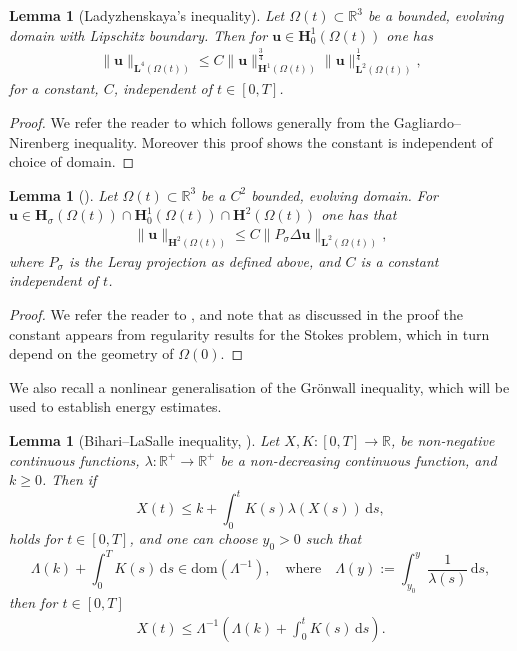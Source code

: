 \documentclass[a4paper]{amsart}
\numberwithin{equation}{section}
\theoremstyle{plain}
\newtheorem{lemma}[theorem]{Lemma}
\newcommand{\mbf}[1]{\mathbf{#1}}
\newcommand{\mbb}[1]{\mathbb{#1}}
\begin{document}
\begin{lemma}[Ladyzhenskaya's inequality]
	Let $\Omega(t) \subset \mbb{R}^3$ be a bounded, evolving domain with Lipschitz boundary.
	Then for $\mbf{u} \in \mbf{H}_0^1(\Omega(t))$ one has
	\begin{align}
		\|\mbf{u}\|_{\mbf{L}^4(\Omega(t))} \leq C \|\mbf{u}\|_{\mbf{H}^1(\Omega(t))}^{\frac{3}{4}}\|\mbf{u}\|_{\mbf{L}^2(\Omega(t))}^{\frac{1}{4}}, \label{ladyzhenskaya inequality}
	\end{align}
	for a constant, $C$, independent of $t \in [0,T]$.
\end{lemma}
\begin{proof}
    We refer the reader to \cite[Lemma 3.3.5]{temam2001navier} which follows generally from the Gagliardo--Nirenberg inequality.
    Moreover this proof shows the constant is independent of choice of domain.
\end{proof}

\begin{lemma}[{\cite[Theorem 2.23]{robinson2016three}}]
	Let $\Omega(t) \subset \mbb{R}^3$ be a $C^{2}$ bounded, evolving domain.
	For $\mbf{u} \in \mbf{H}_\sigma(\Omega(t))\cap \mbf{H}_0^1(\Omega(t))\cap\mbf{H}^2(\Omega(t))$ one has that
	\begin{align}
		\| \mbf{u} \|_{\mbf{H}^2(\Omega(t))} \leq C \| P_\sigma \Delta \mbf{u} \|_{\mbf{L}^2(\Omega(t))}, \label{leray laplacian inequality}
	\end{align}
	where $P_\sigma$ is the Leray projection as defined above, and $C$ is a constant independent of $t$.
\end{lemma}
\begin{proof}
	We refer the reader to \cite[Theorem 2.23]{robinson2016three}, and note that as discussed in the proof the constant appears from regularity results for the Stokes problem, which in turn depend on the geometry of $\Omega(0)$.
\end{proof}

We also recall a nonlinear generalisation of the Gr\"onwall inequality, which will be used to establish energy estimates.

\begin{lemma}[Bihari--LaSalle inequality, \cite{bihari1956generalization}]
	\label{biharilasalle}
	Let $X, K : [0,T] \rightarrow \mbb{R}$, be non-negative continuous
	functions, $\lambda: \mbb{R}^+ \rightarrow \mbb{R}^+$ be a non-decreasing continuous function, and $k \geq 0$.
	Then if
	\[X(t) \leq k + \int_0^t K(s) \lambda(X(s)) \, \mathrm{d}s ,\]
	holds for $t \in [0,T]$, and one can choose $y_0 > 0$ such that
	\[\Lambda(k) + \int_0^T K(s) \, \mathrm{d}s \in \mathrm{dom}(\Lambda^{-1}), \quad \text{where} \quad \Lambda(y) := \int_{y_0}^y \frac{1}{\lambda(s)} \, \mathrm{d}s,\]
	then for $t \in [0,T]$
	\begin{align}
		X(t) \leq \Lambda^{-1}\left( \Lambda(k) + \int_0^t K(s) \, \mathrm{d}s \right). \label{biharilasalle2}
	\end{align}
	
\end{lemma}
\end{document}
